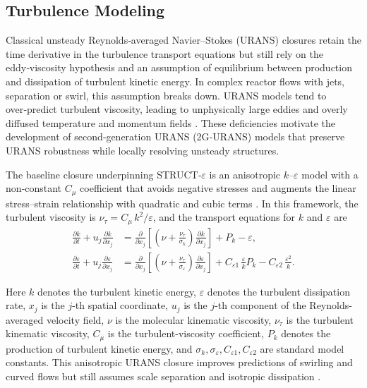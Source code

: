 \documentclass[review]{elsarticle}
\theoremstyle{definition}
\theoremstyle{definition}
\theoremstyle{remark}
\begin{document}
\subsection{Turbulence Modeling}
\label{sec:turbulence}
Classical unsteady Reynolds‑averaged Navier–Stokes (URANS) closures retain the time derivative in the turbulence transport equations but still rely on the eddy‑viscosity hypothesis and an assumption of equilibrium between production and dissipation of turbulent kinetic energy.  In complex reactor flows with jets, separation or swirl, this assumption breaks down. URANS models tend to over‑predict turbulent viscosity, leading to unphysically large eddies and overly diffused temperature and momentum fields \citep{Wiser2022}.  These deficiencies motivate the development of second‑generation URANS (2G‑URANS) models that preserve URANS robustness while locally resolving unsteady structures.

The baseline closure underpinning STRUCT‑\(\varepsilon\) is an anisotropic \(k\text{–}\varepsilon\) model with a non‑constant \(C_{\mu}\) coefficient that avoids negative stresses and augments the linear stress–strain relationship with quadratic and cubic terms \citep{BagliettoNinokata2006}.  In this framework, the turbulent viscosity is \(\nu_{\tau}=C_{\mu}\,k^{2}/\varepsilon\), and the transport equations for \(k\) and \(\varepsilon\) are
\begin{align}
\frac{\partial k}{\partial t}+u_j\frac{\partial k}{\partial x_j} &= \frac{\partial}{\partial x_j}\left[\left(\nu+\frac{\nu_{\tau}}{\sigma_{k}}\right)\frac{\partial k}{\partial x_j}\right]+P_k - \varepsilon,\label{eq:k}\\[0.2em]
\frac{\partial \varepsilon}{\partial t}+u_j\frac{\partial \varepsilon}{\partial x_j} &= \frac{\partial}{\partial x_j}\left[\left(\nu+\frac{\nu_{\tau}}{\sigma_{\varepsilon}}\right)\frac{\partial \varepsilon}{\partial x_j}\right] + C_{\varepsilon 1}\,\frac{\varepsilon}{k}P_k - C_{\varepsilon 2}\,\frac{\varepsilon^2}{k}.\label{eq:eps}
\end{align}

Here \(k\) denotes the turbulent kinetic energy, \(\varepsilon\) denotes the turbulent dissipation rate, \(x_j\) is the \(j\)-th spatial coordinate, \(u_j\) is the \(j\)-th component of the Reynolds-averaged velocity field, \(\nu\) is the molecular kinematic viscosity, \(\nu_\tau\) is the turbulent kinematic viscosity, \(C_\mu\) is the turbulent-viscosity coefficient, \(P_k\) denotes the production of turbulent kinetic energy, and \(\sigma_k,\sigma_\varepsilon,C_{\varepsilon 1},C_{\varepsilon 2}\) are standard model constants. This anisotropic URANS closure improves predictions of swirling and curved flows but still assumes scale separation and isotropic dissipation \citep{lenci2015structure, struct_2GURANS}.
\end{document}
